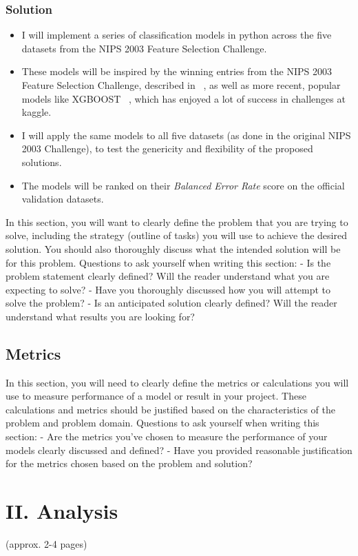 \documentclass[12pt]{article}
\begin{document}
\subsubsection{Solution}
\begin{itemize}
\item I will implement a series of classification models in python across the five datasets from the NIPS 2003 Feature Selection Challenge. 
\item These models will be inspired by the winning entries from the NIPS 2003 Feature Selection Challenge, described in ~\cite{nips03book}, as well as more recent, popular models like XGBOOST ~\cite{xgboostcite}, which has enjoyed a lot of success in challenges at kaggle.
\item I will apply the same models to all five datasets (as done in the original NIPS 2003 Challenge), to test the genericity and flexibility of the proposed solutions.
\item The models will be ranked on their \emph{Balanced Error Rate} score on the official validation datasets.
\end{itemize}


In this section, you will want to clearly define the problem that you are trying to solve, including the strategy (outline of tasks) you will use to achieve the desired solution. You should also thoroughly discuss what the intended solution will be for this problem. Questions to ask yourself when writing this section:
- Is the problem statement clearly defined? Will the reader understand what you are expecting to solve?
- Have you thoroughly discussed how you will attempt to solve the problem?
- Is an anticipated solution clearly defined? Will the reader understand what results you are looking for?

\subsection{Metrics}
In this section, you will need to clearly define the metrics or calculations you will use to measure performance of a model or result in your project. These calculations and metrics should be justified based on the characteristics of the problem and problem domain. Questions to ask yourself when writing this section:
- Are the metrics you’ve chosen to measure the performance of your models clearly discussed and defined?
- Have you provided reasonable justification for the metrics chosen based on the problem and solution?


\section{II. Analysis}
(approx. 2-4 pages)
\end{document}
